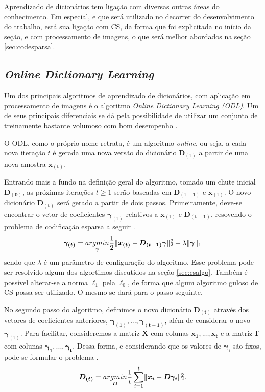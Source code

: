 \documentclass[cic,tc]{iiufrgs}
\def\SPSB#1#2{\rlap{\textsuperscript{#1}}\SB{#2}}
\def\SB#1{\textsubscript{#1}}
\renewcommand{\vec}[1]{\bm{#1}}
\newcommand{\mat}[1]{\bm{#1}}
\begin{document}
Aprendizado de dicionários tem ligação com diversas outras áreas do conhecimento. 
Em especial, e que será utilizado no decorrer do desenvolvimento do trabalho, está sua ligação
com CS, da forma que foi explicitada no início da seção, e com processamento de imagens,
o que será melhor abordados na seção \autoref{sec:codesparsa}.

\subsection{\textit{Online Dictionary Learning}}
\label{sec:odl}
Um dos principais algoritmos de aprendizado de dicionários, com aplicação em processamento de imagens
é o algoritmo \textit{Online Dictionary Learning (ODL)}. Um de seus principais diferenciais
se dá pela possibilidade de utilizar um conjunto de treinamente bastante volumoso com bom 
desempenho \cite{MairalOnlineDictLearn}.

O ODL, como o próprio nome retrata, é um algoritmo \textit{online}, ou seja, a cada nova iteração $t$
é gerada uma nova versão do dicionário $\mat{D_{(t)}}$ a partir de uma nova amostra $\vec{x_{(t)}}$.

Entrando mais a fundo na definição geral do algoritmo, tomado um chute inicial $\mat{D_{(0)}}$, as próximas
iterações $t \ge 1$ serão baseadas em $\mat{D_{(t-1)}}$ e $\vec{x_{(t)}}$. O novo dicionário $\mat{D_{(t)}}$ será
gerado a partir de dois passos. Primeiramente, deve-se encontrar o vetor de coeficientes $\vec{\gamma_{(t)}}$
relativos a $\vec{x_{(t)}}$ e $\mat{D_{(t-1)}}$, resovendo o problema de codificação esparsa a seguir \cite{chen2015compressed}.
\begin{equation}
    \vec{\gamma_{(t)}} = \underset{\vec{\gamma}}{argmin}
    \frac{1}{2} \lVert \vec{x_{(t)}} - \mat{D_{(t-1)}}\vec{\gamma} \rVert\SPSB{2}{2} +
    \lambda \lVert \vec{\gamma} \rVert_1
\end{equation}
sendo que $\lambda$ é um parâmetro de configuração do algoritmo. Esse problema pode ser resolvido algum dos 
algortimos discutidos na seção \autoref{sec:csalgo}. Também é possível alterar-se a norma $\ell_1$ pela $\ell_0$,
de forma que algum algoritmo guloso de CS possa ser utilizado. O mesmo se dará para o passo seguinte.

No segundo passo do algoritmo, definimos o novo dicionário $\mat{D_{(t)}}$ através dos vetores de coeficientes
anteriores, $\vec{\gamma_{(1)}}, ..., \vec{\gamma_{(t-1)}}$, além de considerar o novo $\vec{\gamma_{(t)}}$.
Para facilitar, consideremos a matriz $\mat{X}$ com colunas $\vec{x_1},...,\vec{x_t}$ e a matriz $\mat{\Gamma}$
com colunas $\vec{\gamma_1},...,\vec{\gamma_t}$.
Dessa forma, e considerando que os valores de $\vec{\gamma_i}$ são fixos, pode-se formular o problema \cite{chen2015compressed}.
\begin{equation}
    \mat{D_{(t)}} = \underset{\mat{D}}{argmin}
    \frac{1}{t} \sum_{i=1}^t \lVert \vec{x_i} - \mat{D}\vec{\gamma_i} \rVert\SPSB{2}{2}.
\end{equation}
\end{document}

